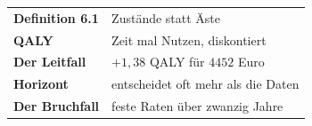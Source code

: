 \begin{merksatz}
\begin{center}
\renewcommand{\arraystretch}{1.5}
\begin{tabular}{@{}P{3.0cm}P{5.6cm}@{}}
\toprule
\textbf{Definition 6.1} & Zustände statt Äste\\
\textbf{QALY} & Zeit mal Nutzen, diskontiert\\
\textbf{Der Leitfall} & $+1{,}38$ QALY für $4452$ Euro\\
\textbf{Horizont} & entscheidet oft mehr als die Daten\\
\textbf{Der Bruchfall} & feste Raten über zwanzig Jahre\\
\bottomrule
\end{tabular}
\end{center}

\begin{center}
\begin{minipage}{0.88\textwidth}
\end{minipage}
\end{center}
\end{merksatz}
